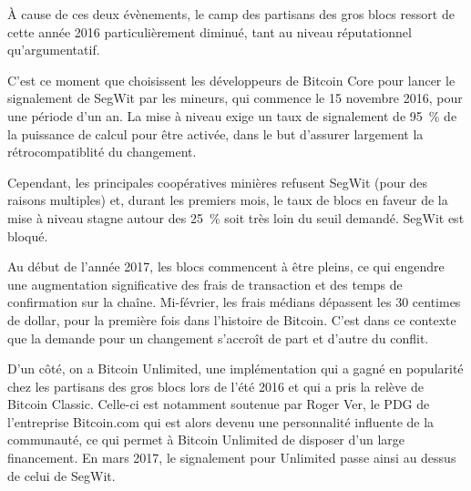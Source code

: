 À cause de ces deux évènements, le camp des partisans des gros blocs ressort de cette année 2016 particulièrement diminué, tant au niveau réputationnel qu'argumentatif.

C'est ce moment que choisissent les développeurs de Bitcoin Core pour lancer le signalement de SegWit par les mineurs, qui commence le 15 novembre 2016, pour une période d'un an. La mise à niveau exige un taux de signalement de 95~\% de la puissance de calcul pour être activée, dans le but d'assurer largement la rétrocompatiblité du changement.

Cependant, les principales coopératives minières refusent SegWit (pour des raisons multiples) et, durant les premiers mois, le taux de blocs en faveur de la mise à niveau stagne autour des 25~\% soit très loin du seuil demandé. SegWit est bloqué.

Au début de l'année 2017, les blocs commencent à être pleins, ce qui engendre une augmentation significative des frais de transaction et des temps de confirmation sur la chaîne. Mi-février, les frais médians dépassent les 30 centimes de dollar, pour la première fois dans l'histoire de Bitcoin. C'est dans ce contexte que la demande pour un changement s'accroît de part et d'autre du conflit.

D'un côté, on a Bitcoin Unlimited, une implémentation qui a gagné en popularité chez les partisans des gros blocs lors de l'été 2016 et qui a pris la relève de Bitcoin Classic. Celle-ci est notamment soutenue par Roger Ver, le PDG de l'entreprise Bitcoin.com qui est alors devenu une personnalité influente de la communauté, ce qui permet à Bitcoin Unlimited de disposer d'un large financement. En mars 2017, le signalement pour Unlimited passe ainsi au dessus de celui de SegWit.

